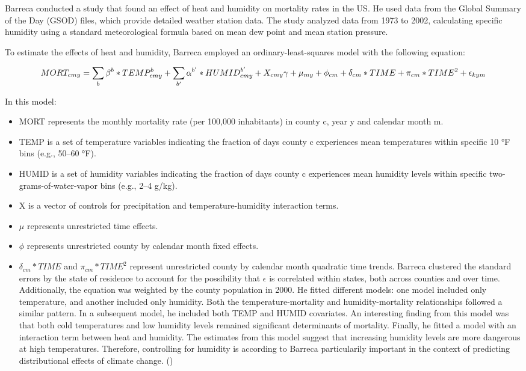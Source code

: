 \documentclass[
]{krantz}
\providecommand{\tightlist}{%
  \setlength{\itemsep}{0pt}\setlength{\parskip}{0pt}}
\begin{document}
Barreca conducted a study that found an effect of heat and humidity on mortality rates in the US. He used data from the Global Summary of the Day (GSOD) files, which provide detailed weather station data. The study analyzed data from 1973 to 2002, calculating specific humidity using a standard meteorological formula based on mean dew point and mean station pressure.

To estimate the effects of heat and humidity, Barreca employed an ordinary-least-squares model with the following equation:

\[
MORT_{cmy} = \sum_b \beta^b*TEMP^b_{cmy} + \sum_{b'} \alpha^{b'} * HUMID^{b'}_{cmy} + X_{cmy} \gamma + \mu_{my} + \\
\phi_{cm} + \delta_{cm} * TIME + \pi_{cm}*TIME^2 + \epsilon_{kym}
\]

In this model:

\begin{itemize}
\tightlist
\item
  MORT represents the monthly mortality rate (per 100,000 inhabitants) in county c, year y and calendar month m.
\item
  TEMP is a set of temperature variables indicating the fraction of days county c experiences mean temperatures within specific 10 °F bins (e.g., 50--60 °F).
\item
  HUMID is a set of humidity variables indicating the fraction of days county c experiences mean humidity levels within specific two-grams-of-water-vapor bins (e.g., 2--4 g/kg).
\item
  X is a vector of controls for precipitation and temperature-humidity interaction terms.
\item
  \(\mu\) represents unrestricted time effects.
\item
  \(\phi\) represents unrestricted county by calendar month fixed effects.
\item
  \(\delta_{cm}*TIME\) and \(\pi_{cm} * TIME^2\) represent unrestricted county by calendar month quadratic time trends.
  Barreca clustered the standard errors by the state of residence to account for the possibility that
  \(\epsilon\) is correlated within states, both across counties and over time. Additionally, the equation was weighted by the county population in 2000.
  He fitted different models: one model included only temperature, and another included only humidity. Both the temperature-mortality and humidity-mortality relationships followed a similar pattern. In a subsequent model, he included both TEMP and HUMID covariates. An interesting finding from this model was that both cold temperatures and low humidity levels remained significant determinants of mortality.
  Finally, he fitted a model with an interaction term between heat and humidity. The estimates from this model suggest that increasing humidity levels are more dangerous at high temperatures.
  Therefore, controlling for humidity is according to Barreca particularily important in the context of predicting distributional effects of climate change. (\citet{barreca2012})
\end{itemize}
\end{document}
